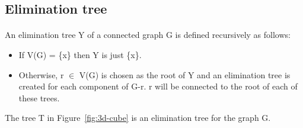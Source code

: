 \subsection{Elimination tree}
\paragraph{}
An elimination tree Y of a connected graph G is defined recursively as follows:
\begin{itemize}
  \item If V(G) = \{x\} then Y is just \{x\}.
  \item Otherwise, r $\in$ V(G) is chosen as the root of Y and an elimination tree is created for each component of G-r. r will be connected to the root of each of these trees.
\end{itemize}
The tree T in Figure~\ref{fig:3d-cube} is an elimination tree for the graph G.
\paragraph{} 